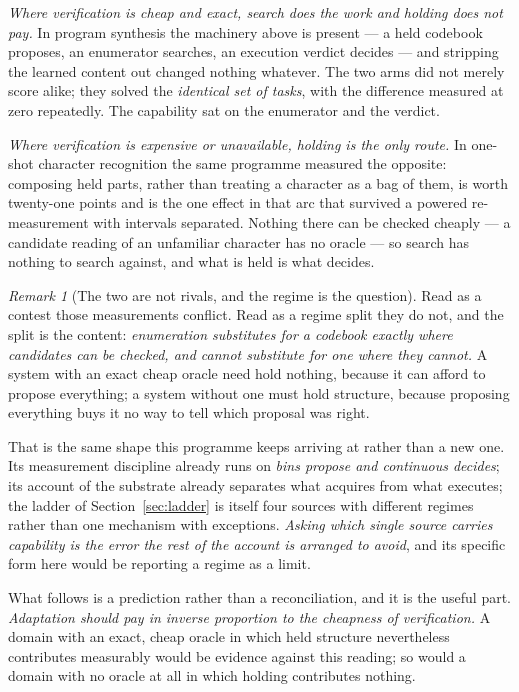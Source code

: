 \documentclass[11pt,a4paper]{article}
\theoremstyle{remark}
\newtheorem{remark}[definition]{Remark}
\begin{document}
\emph{Where verification is cheap and exact, search does the work and holding does not pay.} In program
synthesis the machinery above is present --- a held codebook proposes, an enumerator searches, an
execution verdict decides --- and stripping the learned content out changed nothing whatever. The two
arms did not merely score alike; they solved the \emph{identical set of tasks}, with the difference
measured at zero repeatedly. The capability sat on the enumerator and the verdict.

\emph{Where verification is expensive or unavailable, holding is the only route.} In one-shot character
recognition the same programme measured the opposite: composing held parts, rather than treating a
character as a bag of them, is worth twenty-one points and is the one effect in that arc that survived
a powered re-measurement with intervals separated. Nothing there can be checked cheaply --- a candidate
reading of an unfamiliar character has no oracle --- so search has nothing to search against, and what
is held is what decides.

\begin{remark}[The two are not rivals, and the regime is the question]\label{rem:plural}
Read as a contest those measurements conflict. Read as a regime split they do not, and the split is the
content: \emph{enumeration substitutes for a codebook exactly where candidates can be checked, and
cannot substitute for one where they cannot.} A system with an exact cheap oracle need hold nothing,
because it can afford to propose everything; a system without one must hold structure, because
proposing everything buys it no way to tell which proposal was right.

That is the same shape this programme keeps arriving at rather than a new one. Its measurement
discipline already runs on \emph{bins propose and continuous decides}; its account of the substrate
already separates what acquires from what executes; the ladder of Section~\ref{sec:ladder} is itself
four sources with different regimes rather than one mechanism with exceptions. \emph{Asking which
single source carries capability is the error the rest of the account is arranged to avoid}, and its
specific form here would be reporting a regime as a limit.

What follows is a prediction rather than a reconciliation, and it is the useful part.
\emph{Adaptation should pay in inverse proportion to the cheapness of verification.} A domain with an
exact, cheap oracle in which held structure nevertheless contributes measurably would be evidence
against this reading; so would a domain with no oracle at all in which holding contributes nothing.
\end{remark}
\end{document}
